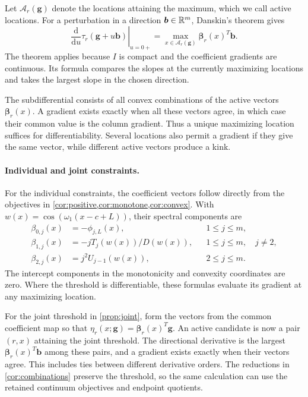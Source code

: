 Let $\mathcal A_r(\boldsymbol g)$ denote the locations attaining
the maximum, which we call active locations.
For a perturbation in a direction $\boldsymbol b\in\mathbb R^m$,
Danskin's theorem \citep[Exercise 6.7]{bertsekas2010convexchapter}
gives
\[
 \left.\frac{\mathrm{d}}{\mathrm{d}u}
       \tau_r(\boldsymbol g+u\boldsymbol b)\right|_{u=0+}
 =\max_{x\in\mathcal A_r(\boldsymbol g)}
       \boldsymbol\beta_r(x)^T\boldsymbol b.
\]
The theorem applies because $I$ is compact and the coefficient
gradients are continuous. Its formula compares the slopes at the
currently maximizing locations and takes the largest slope in the
chosen direction.

The subdifferential consists of all convex combinations of the active
vectors $\boldsymbol\beta_r(x)$. A gradient exists exactly when all
these vectors agree, in which case their common value is the column
gradient. Thus a unique maximizing location suffices for
differentiability. Several locations also permit a gradient if they
give the same vector, while different active vectors produce a kink.

\paragraph{Individual and joint constraints.}
For the individual constraints, the coefficient vectors follow
directly from the objectives in
\cref{cor:positive,cor:monotone,cor:convex}. With
$w(x)=\cos(\omega_1(x-c+L))$, their spectral components are
\[
 \begin{aligned}
  \beta_{0,j}(x)&=-\phi_{j,L}(x),
       &&1\leq j\leq m,\\
  \beta_{1,j}(x)&=-jT_j(w(x))/D(w(x)),
       &&1\leq j\leq m,\quad j\ne2,\\
  \beta_{2,j}(x)&=j^2U_{j-1}(w(x)),
       &&2\leq j\leq m.
 \end{aligned}
\]
The intercept components in the monotonicity and convexity coordinates
are zero. Where the threshold is differentiable, these formulas
evaluate its gradient at any maximizing location.

For the joint threshold in \cref{prop:joint}, form the vectors from
the common coefficient map so that
$\eta_r(x;\boldsymbol g)=\boldsymbol\beta_r(x)^T\boldsymbol g$.
An active candidate is now a pair $(r,x)$ attaining the joint
threshold. The directional derivative is the largest
$\boldsymbol\beta_r(x)^T\boldsymbol b$ among these pairs, and a
gradient exists exactly when their vectors agree. This includes ties
between different derivative orders. The reductions in
\cref{cor:combinations} preserve the threshold, so the same calculation
can use the retained continuum objectives and endpoint quotients.

